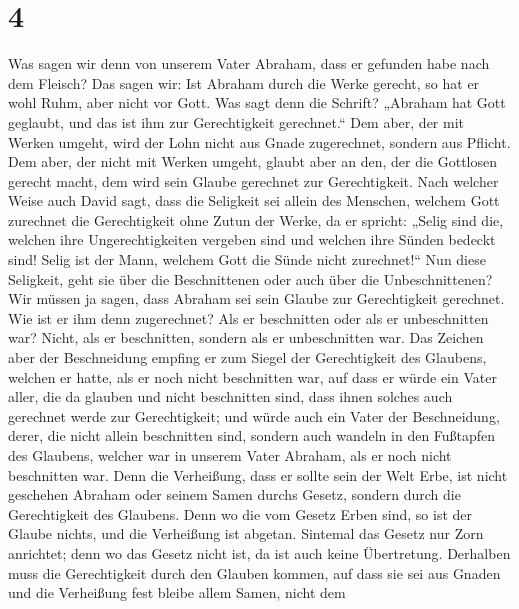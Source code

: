 \hypertarget{section-3}{%
\section{4}\label{section-3}}

 Was sagen wir denn von unserem Vater Abraham, dass er
gefunden habe nach dem Fleisch?  Das sagen wir: Ist
Abraham durch die Werke gerecht, so hat er wohl Ruhm, aber nicht vor
Gott.  Was sagt denn die Schrift? „Abraham hat Gott
geglaubt, und das ist ihm zur Gerechtigkeit gerechnet.`` 
Dem aber, der mit Werken umgeht, wird der Lohn nicht aus Gnade
zugerechnet, sondern aus Pflicht.  Dem aber, der nicht mit
Werken umgeht, glaubt aber an den, der die Gottlosen gerecht macht, dem
wird sein Glaube gerechnet zur Gerechtigkeit.  Nach
welcher Weise auch David sagt, dass die Seligkeit sei allein des
Menschen, welchem Gott zurechnet die Gerechtigkeit ohne Zutun der Werke,
da er spricht:  „Selig sind die, welchen ihre
Ungerechtigkeiten vergeben sind und welchen ihre Sünden bedeckt sind!
 Selig ist der Mann, welchem Gott die Sünde nicht
zurechnet!{}``  Nun diese Seligkeit, geht sie über die
Beschnittenen oder auch über die Unbeschnittenen? Wir müssen ja sagen,
dass Abraham sei sein Glaube zur Gerechtigkeit gerechnet.
 Wie ist er ihm denn zugerechnet? Als er beschnitten oder
als er unbeschnitten war? Nicht, als er beschnitten, sondern als er
unbeschnitten war.  Das Zeichen aber der Beschneidung
empfing er zum Siegel der Gerechtigkeit des Glaubens, welchen er hatte,
als er noch nicht beschnitten war, auf dass er würde ein Vater aller,
die da glauben und nicht beschnitten sind, dass ihnen solches auch
gerechnet werde zur Gerechtigkeit;  und würde auch ein
Vater der Beschneidung, derer, die nicht allein beschnitten sind,
sondern auch wandeln in den Fußtapfen des Glaubens, welcher war in
unserem Vater Abraham, als er noch nicht beschnitten war.
 Denn die Verheißung, dass er sollte sein der Welt Erbe,
ist nicht geschehen Abraham oder seinem Samen durchs Gesetz, sondern
durch die Gerechtigkeit des Glaubens.  Denn wo die vom
Gesetz Erben sind, so ist der Glaube nichts, und die Verheißung ist
abgetan.  Sintemal das Gesetz nur Zorn anrichtet; denn wo
das Gesetz nicht ist, da ist auch keine Übertretung. 
Derhalben muss die Gerechtigkeit durch den Glauben kommen, auf dass sie
sei aus Gnaden und die Verheißung fest bleibe allem Samen, nicht dem
